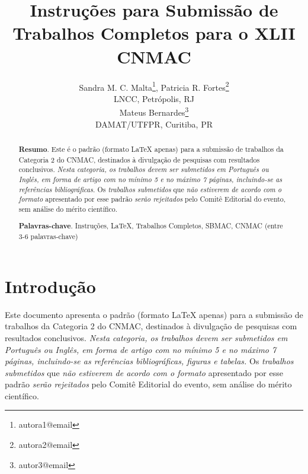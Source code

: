 \documentclass{pssbmac}
\begin{document}

\title{Instruções para Submissão de Trabalhos Completos para o XLII CNMAC}

\author{
    {\large Sandra M. C. Malta}\thanks{autora1@email}, {\large Patricia R. Fortes}\thanks{autora2@email}\\
    {\small LNCC, Petrópolis, RJ} \\
    {\large Mateus Bernardes}\thanks{autor3@email}  \\
    {\small DAMAT/UTFPR, Curitiba, PR} \\
}
\criartitulo



\begin{abstract}
{\bf Resumo}. Este é o padrão (formato \LaTeX{} apenas) para a submissão de trabalhos da Categoria 2 do CNMAC, destinados à divulgação de pesquisas com resultados conclusivos. \emph{Nesta categoria, os trabalhos devem ser submetidos em Português ou Inglês, em forma de artigo com no mínimo 5 e no máximo 7 páginas, incluindo-se as referências bibliográficas.} Os \emph{trabalhos submetidos} que \emph{não estiverem de acordo com o formato} apresentado por esse padrão \emph{serão rejeitados} pelo Comitê Editorial do evento, sem análise do mérito científico.  

\noindent
{\bf Palavras-chave}. Instruções, \LaTeX, Trabalhos Completos, SBMAC, CNMAC  (entre 3-6 palavras-chave)
\end{abstract}

\section{Introdução}

Este documento apresenta o padrão (formato \LaTeX{} apenas) para a submissão de trabalhos da Categoria 2 do CNMAC, destinados à divulgação de pesquisas com resultados conclusivos. \emph{Nesta categoria, os trabalhos devem ser submetidos em Português ou Inglês, em forma de artigo com no mínimo 5 e no máximo 7 páginas, incluindo-se as referências bibliográficas, figuras e tabelas.} Os \emph{trabalhos submetidos} que \emph{não estiverem de acordo com o formato} apresentado por esse padrão \emph{serão rejeitados} pelo Comitê Editorial do evento, sem análise do mérito científico.
\end{document}
